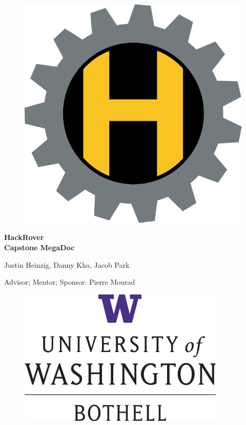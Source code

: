 \documentclass[a4paper, 10pt]{article}
\begin{document}
\begin{titlepage}

	\begin{figure}[h]
		\centering
		\includegraphics[scale=.8]{HackRoverlogolofi}
	\end{figure}

	\begin{center}
		\vspace*{1cm}
	
		\Huge
		\textbf{HackRover}\\[10pt]
	
	
		\large
		\textbf{Capstone MegaDoc}\\[40pt]

		\begin{changemargin}{10pt}{10pt} 
		\begin{center}
		\normalsize
		Justin Heinzig, Danny Kha, Jacob Park
	
		Advisor; Mentor; Sponsor: Pierre Mourad\\[150pt]
		\end{center}
		\end{changemargin}
	\end{center}
	
	\begin{figure}[h]
		\centering
		\includegraphics[scale=.8]{UWLogo}
	\end{figure}		
	

\end{titlepage}
\end{document}

